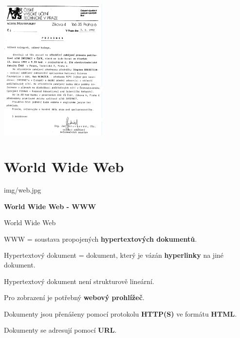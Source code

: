 \documentclass[aspectratio=169]{beamer}
\begin{document}
\begin{frame}
    \begin{center}
    \includegraphics[width=0.4\textwidth]{img/cvut.png}
    \end{center}
\end{frame}

\section{World Wide Web}

\begin{frameImg}[width]{img/web.jpg}
    \vspace*{60mm}
    \begin{cardTiny}
        \vspace*{\fill}
        \begin{center}
            \textbf{World Wide Web - WWW}
        \end{center}
    \end{cardTiny}
\end{frameImg}

\begin{frame}{World Wide Web}
    \begin{cardTiny}
        \begin{flushleft}
            WWW = soustava propojených \textbf{hypertextových dokumentů}.

            \vspace{2ex}
            Hypertextový dokument = dokument, který je vázán \textbf{hyperlinky} na jiné dokument.

            Hypertextový dokument není strukturově lineární.

            \vspace{2ex}
            Pro zobrazení je potřebný \textbf{webový prohlížeč}.

            \vspace{2ex}
            Dokumenty jsou přenášeny pomocí protokolu \textbf{HTTP(S)} ve formátu \textbf{HTML}.

            \vspace{2ex}
            Dokumenty se adresují pomocí \textbf{URL}.
        \end{flushleft}
    \end{cardTiny}
\end{frame}
\end{document}
